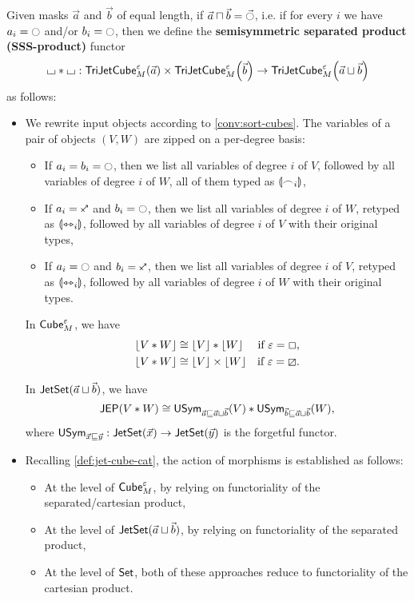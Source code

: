 \documentclass[a4paper]{memoir}
\begin{document}
\begin{definition} \label{def:sssprod}
	Given masks $\vec a$ and $\vec b$ of equal length, if $\vec a \sqcap \vec b = \vec \npolar$, i.e. if for every $i$ we have $a_i = \npolar$ and/or $b_i = \npolar$, then we define the \textbf{semisymmetric separated product (SSS-product)} functor
	\[
		{\llcorner\hspace{-.4ex}\lrcorner} * {\llcorner\hspace{-.4ex}\lrcorner} : \mathsf{TriJetCube}^{\varepsilon}_{M}\mathopen{}\left( \vec a \right)\mathclose{} \times \mathsf{TriJetCube}^{\varepsilon}_{M}\mathopen{}\left( \vec b \right)\mathclose{} \to \mathsf{TriJetCube}^{\varepsilon}_{M}\mathopen{}\left( \vec a \sqcup \vec b \right)\mathclose{}
	\]
	as follows:
	\begin{itemize}
		\item We rewrite input objects according to \cref{conv:sort-cubes}.
		The variables of a pair of objects $(V, W)$ are zipped on a per-degree basis:
		\begin{itemize}
			\item If $a_i = b_i = \npolar$, then we list all variables of degree $i$ of $V$, followed by all variables of degree $i$ of $W$, all of them typed as ${\llparenthesis \frown_i \rrparenthesis}$,
			\item If $a_i = \ypolar$ and $b_i = \npolar$, then we list all variables of degree $i$ of $W$, retyped as ${\llparenthesis \leftrightarrowtriangle_i \rrparenthesis}$, followed by all variables of degree $i$ of $V$ with their original types,
			\item If $a_i = \npolar$ and $b_i = \ypolar$, then we list all variables of degree $i$ of $V$, retyped as ${\llparenthesis \leftrightarrowtriangle_i \rrparenthesis}$, followed by all variables of degree $i$ of $W$ with their original types.
		\end{itemize}
		\begin{corollary} \label{thm:erase-sssprod}
			In ${\mathsf{Cube}}_M^\varepsilon$, we have
			\begin{align*}
				\mathopen{}\left\lfloor V * W \right\rfloor\mathclose{} &\cong \mathopen{}\left\lfloor V \right\rfloor\mathclose{} * \mathopen{}\left\lfloor W \right\rfloor\mathclose{} &\text{if $\varepsilon = \Box$,} \\
				\mathopen{}\left\lfloor V * W \right\rfloor\mathclose{} &\cong \mathopen{}\left\lfloor V \right\rfloor\mathclose{} \times \mathopen{}\left\lfloor W \right\rfloor\mathclose{} &\text{if $\varepsilon = \boxslash$.}
			\end{align*}
		\end{corollary}
		\begin{corollary}
			In $\mathsf{JetSet}(\vec a \sqcup \vec b)$, we have
			\[
				\mathsf{JEP}(V * W) \cong \mathsf{USym}_{\vec a \sqsubseteq \vec a \sqcup \vec b}(V) * \mathsf{USym}_{\vec b \sqsubseteq \vec a \sqcup \vec b}(W),
			\]
			where $\mathsf{USym}_{\vec x \sqsubseteq \vec y} : \mathsf{JetSet}(\vec x) \to \mathsf{JetSet}(\vec y)$ is the forgetful functor.
		\end{corollary}
		\item Recalling \cref{def:jet-cube-cat}, the action of morphisms is established as follows:
		\begin{itemize}
			\item At the level of ${\mathsf{Cube}}_M^\varepsilon$, by relying on functoriality of the separated/cartesian product,
			\item At the level of $\mathsf{JetSet}(\vec a \sqcup \vec b)$, by relying on functoriality of the separated product,
			\item At the level of ${\mathsf{Set}}$, both of these approaches reduce to functoriality of the cartesian product.
		\end{itemize}
	\end{itemize}
\end{definition}
\end{document}
